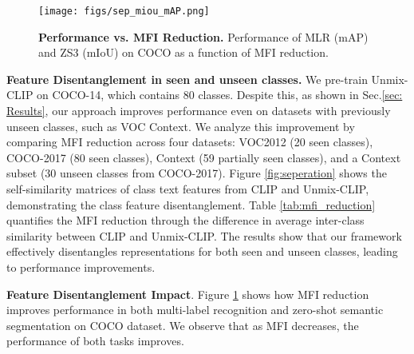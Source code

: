 % 



\begin{figure}[tp]
  \centering
  \texttt{[image: figs/sep\_miou\_mAP.png]}
  \caption{\textbf{Performance vs. MFI Reduction.} Performance of MLR (mAP) and ZS3 (mIoU) on COCO as a function of MFI reduction.}
  \label{fig: mAP_mIOU_MFI_red}
\end{figure}



\textbf{Feature Disentanglement in seen and unseen classes.} 
We pre-train Unmix-CLIP on COCO-14, which contains 80 classes. Despite this, as shown in Sec.\ref{sec: Results}, our approach improves performance even on datasets with previously unseen classes, such as VOC Context. We analyze this improvement by comparing MFI reduction across four datasets: VOC2012 (20 seen classes), COCO-2017 (80 seen classes), Context (59 partially seen classes), and a Context subset (30 unseen classes from COCO-2017). Figure \ref{fig:seperation} shows the self-similarity matrices of class text features from CLIP and Unmix-CLIP, demonstrating the class feature disentanglement. Table \ref{tab:mfi_reduction} quantifies the MFI reduction through the difference in average inter-class similarity between CLIP and Unmix-CLIP. The results show that our framework effectively disentangles representations for both seen and unseen classes, leading to performance improvements.



\textbf{Feature Disentanglement Impact}. Figure \ref{fig: mAP_mIOU_MFI_red} shows how MFI reduction improves performance in both multi-label recognition and zero-shot semantic segmentation on COCO dataset.  We observe that as MFI decreases, the performance of both tasks improves.







